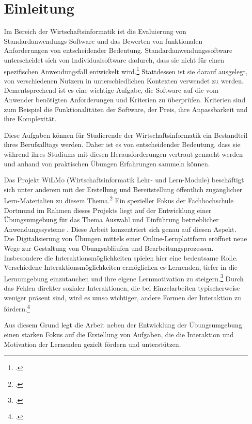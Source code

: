 \chapter{Einleitung}


Im Bereich der Wirtschaftsinformatik ist die Evaluierung von
Standardanwendungs-Software und das Bewerten von funktionalen Anforderungen von entscheidender Bedeutung.
Standardanwendungssoftware unterscheidet sich von Individualsoftware dadurch, dass sie nicht für einen spezifischen Anwendungsfall entwickelt wird.\footcite[Vgl.][S. 3]{Teich2008}{}{} Stattdessen ist sie darauf ausgelegt, von verschiedenen Nutzern in unterschiedlichen Kontexten verwendet zu werden.
Dementsprechend ist es eine wichtige Aufgabe, die Software auf die vom Anwender benötigten Anforderungen und Kriterien zu überprüfen. Kriterien sind zum Beispiel die Funktionalitäten der Software, der Preis, ihre Anpassbarkeit und ihre Komplexität.

Diese Aufgaben können für Studierende der Wirtschaftsinformatik ein Bestandteil ihres Berufsalltags  werden. Daher ist es von entscheidender Bedeutung, dass sie während ihres Studiums mit diesen Herausforderungen vertraut gemacht werden und anhand von praktischen Übungen Erfahrungen sammeln können.

Das Projekt WiLMo (Wirtschaftsinformatik Lehr- und Lern-Module) beschäftigt sich unter anderem mit der Erstellung und Bereitstellung öffentlich zugänglicher Lern-Materialien zu diesem Thema.\footcite[Vgl.][]{wilmo}{}{}
Ein spezieller Fokus der Fachhochschule Dortmund im Rahmen dieses Projekts liegt auf der Entwicklung einer Übungsumgebung für das Thema \glqq Auswahl und Einführung betrieblicher Anwendungssysteme\grqq
. Diese Arbeit konzentriert sich genau auf diesen Aspekt.
Die Digitalisierung von Übungen mittels einer Online-Lernplattform eröffnet neue Wege zur Gestaltung von Übungsabläufen und Bearbeitungsprozessen.
Insbesondere die Interaktionsmöglichkeiten spielen hier eine bedeutsame Rolle.
Verschiedene Interaktionsmöglichkeiten ermöglichen es Lernenden, tiefer in die Lernumgebung einzutauchen und ihre eigene Lernmotivation zu steigern.\footcite[Vgl.][S.638]{BolognaDigital}{}{}
Durch das Fehlen direkter sozialer Interaktionen, die bei Einzelarbeiten typischerweise weniger präsent sind, wird es umso wichtiger, andere Formen der Interaktion zu fördern.\footcite[Vgl.][S.638]{BolognaDigital}{}{}

Aus diesem Grund legt die Arbeit neben der Entwicklung der Übungsumgebung einen starken Fokus auf die Erstellung von Aufgaben, die die Interaktion und Motivation der Lernenden gezielt fördern und unterstützen.

